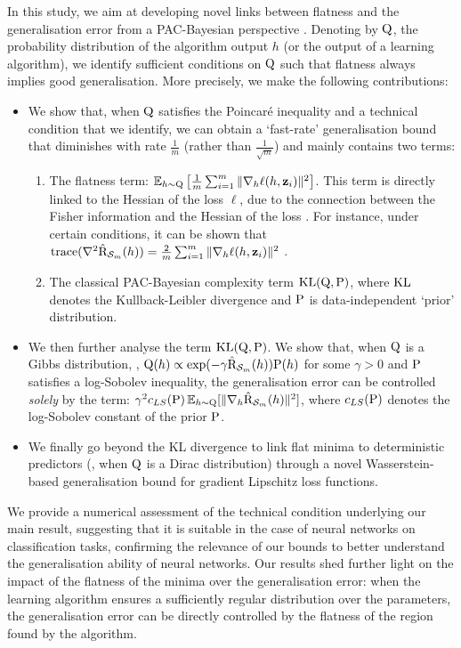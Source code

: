 In this study, we aim at developing novel links between flatness and the generalisation error from a PAC-Bayesian perspective \citep[see \eg, ][]{guedj2019primer,hellstrom2023generalization,alquier2024user}.
Denoting by $\Q$, the probability distribution of the algorithm output $h$ (or the output of a learning algorithm), we identify sufficient conditions on $\Q$ such that flatness always implies good generalisation.
More precisely, we make the following contributions:
\begin{itemize}
    \item We show that, when $\Q$ satisfies the Poincaré inequality and a technical condition that we identify, we can obtain a `fast-rate' generalisation bound that diminishes with rate $\frac{1}{m}$ (rather than $\frac{1}{\sqrt{m}}$) and mainly contains two terms:  
    \begin{enumerate}[label=(\roman*)]
        \item The flatness term: $ \EE_{h\sim \Q}\LB \frac{1}{m}\sum_{i=1}^m \|\nabla_h\ell(h,\z_i)\|^2 \RB$.
        This term is directly linked to the Hessian of the loss $\ell$, due to the connection between the Fisher information and the Hessian of the loss \cite{bickel2015mathematical}.
        For instance, under certain conditions, it can be shown that $\mathrm{trace}(\nabla^2 \hat{\Risk}_{\S_m}(h)) = \frac{2}{m}\sum_{i=1}^m \|\nabla_h \ell(h,\z_i)\|^2$ \citep[Lemma 4.1]{wen2023sharpness}.  
        \item The classical PAC-Bayesian complexity term $\KL(\Q,\P)$, where $\KL$ denotes the Kullback-Leibler divergence and $\P$ is data-independent `prior' distribution. 
    \end{enumerate}
    \item We then further analyse the term $\KL(\Q,\P)$.
    We show that, when $\Q$ is a Gibbs distribution, \ie, $\Q(h)\propto \exp(- \gamma \hat{\Risk}_{\S_m}(h)) \P(h)$ for some $\gamma >0$ and $\P$ satisfies a log-Sobolev inequality, the generalisation error can be controlled \emph{solely} by the term: $\gamma^2 c_{LS}(\P)\EE_{h\sim \Q}[ \|\nabla_h \hat{\Risk}_{\S_m}(h) \|^2 ]$, where $c_{LS}(\P)$ denotes the log-Sobolev constant of the prior $\P$. 
    \item We finally go beyond the KL divergence to link flat minima to deterministic predictors (\ie, when $\Q$ is a Dirac distribution) through a novel Wasserstein-based generalisation bound for gradient Lipschitz loss functions. 
\end{itemize}
We provide a numerical assessment of the technical condition underlying our main result, suggesting that it is suitable in the case of neural networks on classification tasks, confirming the relevance of our bounds to better understand the generalisation ability of neural networks.
Our results shed further light on the impact of the flatness of the minima over the generalisation error: when the learning algorithm ensures a sufficiently regular distribution over the parameters, the generalisation error can be directly controlled by the flatness of the region found by the algorithm.  

